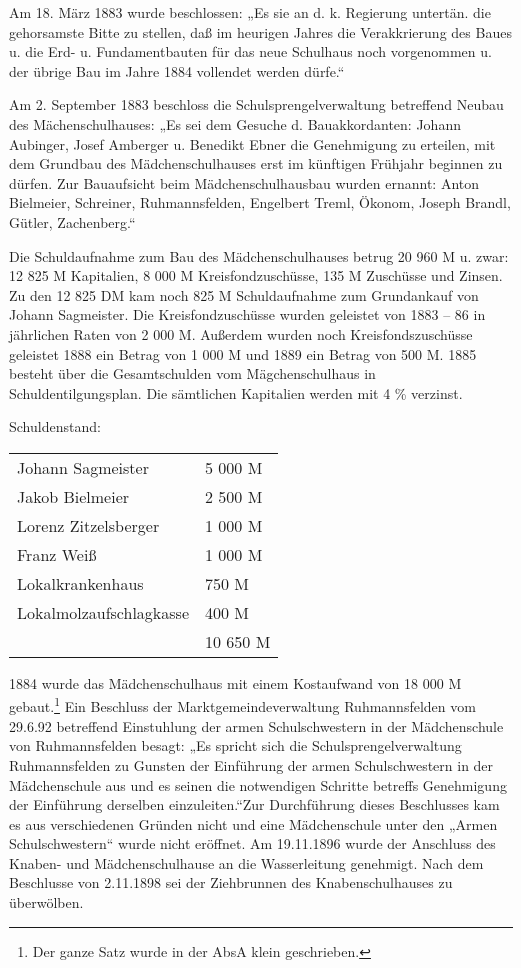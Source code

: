 \documentclass[12pt,a4paper]{book}
\begin{document}
Am 18. März 1883 wurde beschlossen: „Es sie an d. k. Regierung untertän. die
gehorsamste Bitte zu stellen, daß im heurigen Jahres die Verakkrierung des Baues
u. die Erd- u. Fundamentbauten für das neue Schulhaus noch vorgenommen u. der
übrige Bau im Jahre 1884 vollendet werden dürfe.“

Am 2. September 1883 beschloss die Schulsprengelverwaltung betreffend Neubau des
Mächenschulhauses: „Es sei dem Gesuche d. Bauakkordanten: Johann Aubinger, Josef
Amberger u. Benedikt Ebner die Genehmigung zu erteilen, mit dem Grundbau des
Mädchenschulhauses erst im künftigen Frühjahr beginnen zu dürfen. Zur
Bauaufsicht beim Mädchenschulhausbau wurden ernannt: Anton Bielmeier, Schreiner,
Ruhmannsfelden, Engelbert Treml, Ökonom, Joseph Brandl, Gütler, Zachenberg.“

Die Schuldaufnahme zum Bau des Mädchenschulhauses betrug 20 960 M u. zwar: 12
825 M Kapitalien, 8 000 M Kreisfondzuschüsse, 135 M Zuschüsse und Zinsen. Zu den
12 825 DM kam noch 825 M Schuldaufnahme zum Grundankauf von Johann Sagmeister.
Die Kreisfondzuschüsse wurden geleistet von 1883 – 86 in jährlichen Raten von 2
000 M. Außerdem wurden noch Kreisfondszuschüsse geleistet 1888 ein Betrag von 1
000 M und 1889 ein Betrag von 500 M. 1885 besteht über die Gesamtschulden vom
Mägchenschulhaus in Schuldentilgungsplan. Die sämtlichen Kapitalien werden mit 4
\% verzinst.

Schuldenstand:

\begin{tabular}{ll}
Johann Sagmeister & 5 000 M \\
Jakob Bielmeier & 2 500 M \\
Lorenz Zitzelsberger & 1 000 M \\
Franz Weiß & 1 000 M \\
Lokalkrankenhaus & 750 M \\
Lokalmolzaufschlagkasse & 400 M \\
\hline
& 10 650 M  \\
\end{tabular}

1884 wurde das Mädchenschulhaus mit einem Kostaufwand von 18 000 M
gebaut.\footnote{Der ganze Satz wurde in der AbsA klein geschrieben.} Ein
Beschluss der Marktgemeindeverwaltung Ruhmannsfelden vom 29.6.92 betreffend
Einstuhlung der armen Schulschwestern in der Mädchenschule von Ruhmannsfelden
besagt: „Es spricht sich die Schulsprengelverwaltung Ruhmannsfelden zu Gunsten
der Einführung der armen Schulschwestern in der Mädchenschule aus und es seinen
die notwendigen Schritte betreffs Genehmigung der Einführung derselben
einzuleiten.“Zur Durchführung dieses Beschlusses kam es aus verschiedenen
Gründen nicht und eine Mädchenschule unter den „Armen Schulschwestern“ wurde
nicht eröffnet. Am 19.11.1896 wurde der Anschluss des Knaben- und
Mädchenschulhause an die Wasserleitung genehmigt. Nach dem Beschlusse von
2.11.1898 sei der Ziehbrunnen des Knabenschulhauses zu überwölben.
\end{document}

